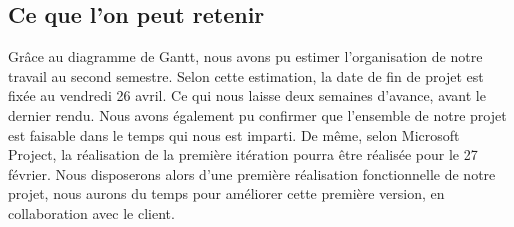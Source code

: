 \subsection{Ce que l'on peut retenir}

Grâce au diagramme de Gantt, nous avons pu estimer l’organisation de notre travail au second semestre. Selon cette estimation, la date de fin de projet est fixée au vendredi 26 avril. Ce qui nous laisse deux semaines d’avance, avant le dernier rendu. Nous avons également pu confirmer que l’ensemble de notre projet est faisable dans le temps qui nous est imparti. De même, selon Microsoft Project, la réalisation de la première itération pourra être réalisée pour le 27 février. Nous disposerons alors d’une première réalisation fonctionnelle de notre projet, nous aurons du temps pour améliorer cette première version, en collaboration avec le client.














